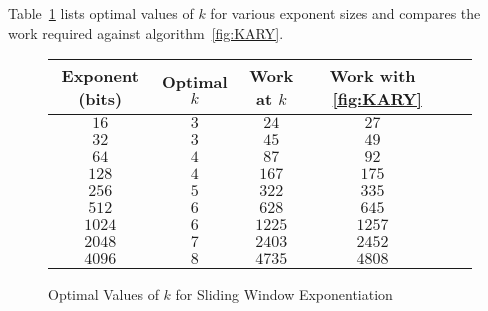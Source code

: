 \documentclass[b5paper]{book}
\begin{document}
Table~\ref{fig:OPTK2} lists optimal values of $k$ for various exponent sizes and compares the work required against algorithm~\ref{fig:KARY}.  

\begin{figure}[here]
\begin{center}
\begin{small}
\begin{tabular}{|c|c|c|c|c|c|}
\hline \textbf{Exponent (bits)} & \textbf{Optimal $k$} & \textbf{Work at $k$} & \textbf{Work with ~\ref{fig:KARY}} \\
\hline $16$ & $3$ & $24$ & $27$ \\
\hline $32$ & $3$ & $45$ & $49$ \\
\hline $64$ & $4$ & $87$ & $92$ \\
\hline $128$ & $4$ & $167$ & $175$ \\
\hline $256$ & $5$ & $322$ & $335$ \\
\hline $512$ & $6$ & $628$ & $645$ \\
\hline $1024$ & $6$ & $1225$ & $1257$ \\
\hline $2048$ & $7$ & $2403$ & $2452$ \\
\hline $4096$ & $8$ & $4735$ & $4808$ \\
\hline
\end{tabular}
\end{small}
\end{center}
\caption{Optimal Values of $k$ for Sliding Window Exponentiation}
\label{fig:OPTK2}
\end{figure}
\end{document}
